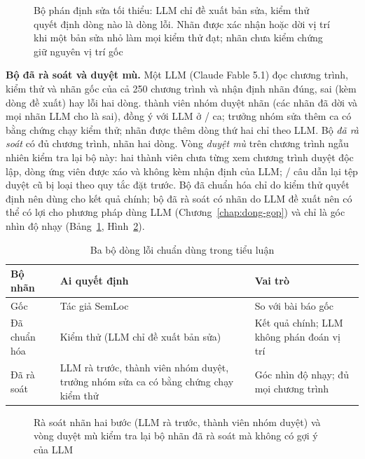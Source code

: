 \begin{figure}[H]\centering

\caption{Bộ phán định sửa tối thiểu: LLM chỉ đề xuất bản sửa, kiểm thử quyết định dòng nào là dòng lỗi. Nhãn được xác nhận hoặc dời vị trí khi một bản sửa nhỏ làm mọi kiểm thử đạt; nhãn chưa kiểm chứng giữ nguyên vị trí gốc}\label{fig:sua-nhan}
\end{figure}

\textbf{Bộ đã rà soát và duyệt mù.} Một LLM (Claude Fable 5.1) đọc chương trình, kiểm thử và nhãn gốc của cả 250
chương trình và nhận định nhãn đúng, sai (kèm dòng đề xuất) hay lỗi hai dòng. \ReviewReviewersN{} thành viên nhóm duyệt
\ReviewHumanN{} nhãn (các nhãn đã dời và mọi nhãn LLM cho là sai), đồng ý với LLM ở \ReviewAgreeN{}/\ReviewHumanN{} ca;
trưởng nhóm sửa thêm \ReviewOverrideN{} ca có bằng chứng chạy kiểm thử; \LabaudAllExtended{} nhãn được thêm dòng thứ hai
chỉ theo LLM. Bộ \emph{đã rà soát} có đủ \LabaudAllN{} chương trình, \LabaudAllTwoLine{} nhãn hai dòng. Vòng \emph{duyệt
mù} trên \BlindBlindAllPrograms{} chương trình ngẫu nhiên kiểm tra lại bộ này: hai thành viên chưa từng xem chương trình
duyệt độc lập, dòng ứng viên được xáo và không kèm nhận định của LLM; \BlindAnswersExcluded{}/\BlindAnswersTotal{} câu
dẫn lại tệp duyệt cũ bị loại theo quy tắc đặt trước. Bộ đã chuẩn hóa chỉ do kiểm thử quyết định nên dùng cho kết quả
chính; bộ đã rà soát có nhãn do LLM đề xuất nên có thể có lợi cho phương pháp dùng LLM (Chương~\ref{chap:dong-gop}) và
chỉ là góc nhìn độ nhạy (Bảng~\ref{tab:ba-bo-nhan}, Hình~\ref{fig:ra-soat}).

\begin{table}[H]\centering
\caption{Ba bộ dòng lỗi chuẩn dùng trong tiểu luận}\label{tab:ba-bo-nhan}
\small
\begin{tabularx}{\linewidth}{@{}l>{\raggedright\arraybackslash}X>{\raggedright\arraybackslash}X@{}}
\toprule Bộ nhãn & Ai quyết định & Vai trò \\ \midrule
Gốc & Tác giả SemLoc & So với bài báo gốc \\
Đã chuẩn hóa & Kiểm thử (LLM chỉ đề xuất bản sửa) & Kết quả chính; LLM không phán đoán vị trí \\
Đã rà soát & LLM rà trước, thành viên nhóm duyệt, trưởng nhóm sửa ca có bằng chứng chạy kiểm thử & Góc nhìn độ nhạy; đủ mọi chương trình \\
\bottomrule\end{tabularx}
\end{table}

\begin{figure}[H]\centering

\caption{Rà soát nhãn hai bước (LLM rà trước, thành viên nhóm duyệt) và vòng duyệt mù kiểm tra lại bộ nhãn đã rà soát mà không có gợi ý của LLM}\label{fig:ra-soat}
\end{figure}

